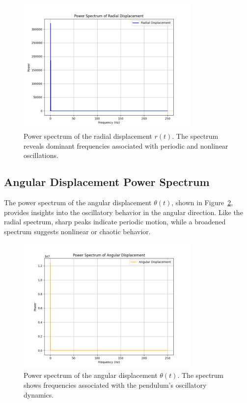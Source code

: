 \documentclass[12pt]{article}
\begin{document}
\begin{figure}[h!]
    \centering
    \includegraphics[width=0.8\textwidth]{power_spectrum_radial.png}
    \caption{Power spectrum of the radial displacement \( r(t) \). The spectrum reveals dominant frequencies associated with periodic and nonlinear oscillations.}
    \label{fig:power_spectrum_radial}
\end{figure}

\subsection{Angular Displacement Power Spectrum}
The power spectrum of the angular displacement \( \theta(t) \), shown in Figure~\ref{fig:power_spectrum_angular}, provides insights into the oscillatory behavior in the angular direction. Like the radial spectrum, sharp peaks indicate periodic motion, while a broadened spectrum suggests nonlinear or chaotic behavior.

\begin{figure}[h!]
    \centering
    \includegraphics[width=0.8\textwidth]{power_spectrum_angular.png}
    \caption{Power spectrum of the angular displacement \( \theta(t) \). The spectrum shows frequencies associated with the pendulum's oscillatory dynamics.}
    \label{fig:power_spectrum_angular}
\end{figure}
\end{document}
